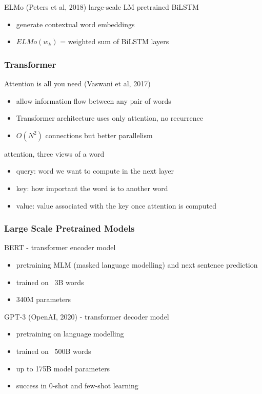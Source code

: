 \documentclass[]{article}
\theoremstyle{definition}
\begin{document}
ELMo (Peters et al, 2018) large-scale LM pretrained BiLSTM
\begin{itemize}
    \item generate contextual word embeddings
    \item $ELMo(w_k)$ = weighted sum of BiLSTM layers
\end{itemize}

\subsubsection{Transformer}%
\label{ssub:transformer}

Attention is all you need (Vaswani et al, 2017)
\begin{itemize}
    \item allow information flow between any pair of words
    \item Transformer architecture uses only attention, no recurrence
    \item $O(N^2)$ connections but better parallelism
\end{itemize}

attention, three views of a word
\begin{itemize}
    \item query: word we want to compute in the next layer
    \item key: how important the word is to another word
    \item value: value associated with the key once attention is computed
\end{itemize}


\subsubsection{Large Scale Pretrained Models}%
\label{ssub:large_scale_pretrained_models}


BERT - transformer encoder model
\begin{itemize}
    \item pretraining MLM (masked language modelling) and next sentence prediction
    \item trained on ~3B words
    \item 340M parameters
\end{itemize}

GPT-3 (OpenAI, 2020) - transformer decoder model
\begin{itemize}
    \item pretraining on language modelling
    \item trained on ~500B words
    \item up to 175B model parameters
    \item success in 0-shot and few-shot learning
\end{itemize}
\end{document}
